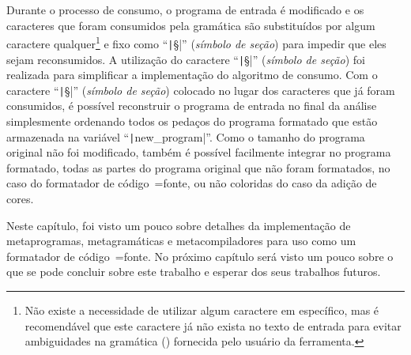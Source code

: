 Durante o processo de consumo,
o programa de entrada é modificado e
os caracteres que foram consumidos pela gramática são substituídos por algum caractere qualquer\footnote{
Não existe a necessidade de utilizar algum caractere em específico,
mas é recomendável que este caractere já não exista no texto de entrada para evitar ambiguidades na gramática () fornecida pelo usuário da ferramenta.
}
e fixo como ``\texttt|§|'' (\textit{símbolo de seção}) para impedir que eles sejam reconsumidos.
A utilização do caractere ``\texttt|§|'' (\textit{símbolo de seção}) foi realizada para simplificar a implementação do algoritmo de consumo.
Com o caractere ``\texttt|§|'' (\textit{símbolo de seção}) colocado no lugar dos caracteres que já foram consumidos,
é possível reconstruir o programa de entrada no final da análise simplesmente ordenando todos os pedaços do programa formatado que estão armazenada na variável ``\texttt|new_program|''.
Como o tamanho do programa original não foi modificado,
também é possível facilmente integrar no programa formatado,
todas as partes do programa original que não foram formatados,
no caso do formatador de código~=fonte,
ou não coloridas do caso da adição de cores.

Neste capítulo,
foi visto um pouco sobre detalhes da implementação de metaprogramas,
metagramáticas e
metacompiladores para uso como um formatador de código~=fonte.
No próximo capítulo será visto um pouco sobre o que se pode concluir sobre este trabalho e
esperar dos seus trabalhos futuros.
